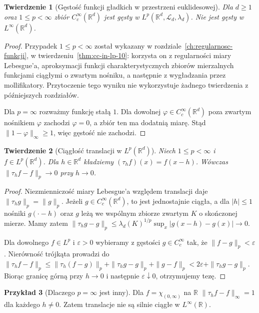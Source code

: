 \documentclass[11pt,a4paper,oneside]{book}
\numberwithin{equation}{chapter}
\theoremstyle{plain}
\newtheorem{twierdzenie}{Twierdzenie}[chapter]
\theoremstyle{definition}
\newtheorem{przyklad}[twierdzenie]{Przykład}
\theoremstyle{remark}
\begin{document}
\begin{twierdzenie}[Gęstość funkcji gładkich w przestrzeni euklidesowej]
\label{thm:cc-dense-lp-14}
Dla $d\ge1$ oraz $1\le p<\infty$ zbiór
$C_c^\infty(\mathbb R^d)$ jest gęsty w
$L^p(\mathbb R^d,\mathcal L_d,\lambda_d)$.
Nie jest gęsty w $L^\infty(\mathbb R^d)$.
\end{twierdzenie}
\begin{proof}
Przypadek $1\le p<\infty$ został wykazany
w rozdziale~\ref{ch:regularnosc-funkcji},
w twierdzeniu~\ref{thm:cc-in-lp-10}:
korzysta on z regularności miary Lebesgue'a,
aproksymacji funkcji charakterystycznych zbiorów mierzalnych
funkcjami ciągłymi o zwartym nośniku,
a następnie z wygładzania przez mollifikatory.
Przytoczenie tego wyniku nie wykorzystuje
żadnego twierdzenia z późniejszych rozdziałów.

Dla $p=\infty$ rozważmy funkcję stałą $1$.
Dla dowolnej $\varphi\in C_c^\infty(\mathbb R^d)$
poza zwartym nośnikiem $\varphi$ zachodzi $\varphi=0$,
a zbiór ten ma dodatnią miarę. Stąd
$\|1-\varphi\|_\infty\ge1$, więc gęstość nie zachodzi.
\end{proof}

\begin{twierdzenie}[Ciągłość translacji w $L^p(\mathbb R^d)$]
\label{thm:translation-lp-14}
Niech $1\le p<\infty$ i $f\in L^p(\mathbb R^d)$.
Dla $h\in\mathbb R^d$ kładziemy
$(\tau_hf)(x)=f(x-h)$.
Wówczas $\|\tau_hf-f\|_p\to0$ przy $h\to0$.
\end{twierdzenie}
\begin{proof}
Niezmienniczość miary Lebesgue'a względem translacji
daje $\|\tau_hg\|_p=\|g\|_p$.
Jeżeli $g\in C_c^\infty(\mathbb R^d)$, to jest
jednostajnie ciągła, a dla $|h|\le1$
nośniki $g(\cdot-h)$ oraz $g$ leżą we wspólnym
zbiorze zwartym $K$ o skończonej mierze.
Mamy zatem
$\|\tau_hg-g\|_p\le
\lambda_d(K)^{1/p}\sup_x|g(x-h)-g(x)|\to0$.

Dla dowolnego $f\in L^p$ i $\varepsilon>0$
wybieramy z gęstości $g\in C_c^\infty$ tak, że
$\|f-g\|_p<\varepsilon$.
Nierówność trójkąta prowadzi do
$\|\tau_hf-f\|_p\le
\|\tau_h(f-g)\|_p+\|\tau_hg-g\|_p+\|g-f\|_p
<2\varepsilon+\|\tau_hg-g\|_p$.
Biorąc granicę górną przy $h\to0$ i następnie
$\varepsilon\downarrow0$, otrzymujemy tezę.
\end{proof}

\begin{przyklad}[Dlaczego $p=\infty$ jest inny]
Dla $f=\chi_{(0,\infty)}$ na $\mathbb R$
$\|\tau_hf-f\|_\infty=1$ dla każdego $h\ne0$.
Zatem translacje nie są silnie ciągłe w
$L^\infty(\mathbb R)$.
\end{przyklad}
\end{document}

